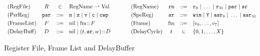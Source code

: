 \begin{figure}[!t]
	\small
	\[
		\begin{array}{lcclclccl}
			\TYPE{(RegFile)} & \RFile & \in & 
			\TYPE{RegName} \rightharpoonup \TYPE{Val}
         & \quad \ \ &
        \TYPE{(RegName)} & \regN & \define &
		 \reg{0} \sepline \dots \sepline \reg{31} \sepline \psr \sepline \sr \\
		 \\[-9pt]
		
		\TYPE{(PsrReg)} & \psr & \define &
		\regn \sepline
			\regz \sepline
			\regv \sepline
			\regc \sepline \regcwp & \quad &
		\TYPE{(SpeReg)} & \sr & \define &
		\regwim \sepline
			\regY \sepline
\asr_0 \sepline \dots \sepline \asr_{31} \\ \\[-9pt]
		
		\TYPE{(FrameList)} & \Wstack & \define &
            \nil \sepline \fm \stCons \Wstack & \quad &
		\TYPE{(Frame)} & \fm & \define & [\val_0, \dots, \val_7] 
		\\ \\[-9pt]
		
		\TYPE{(DelayBuff)} & \DBuf & \define & \nil \sepline
                                  (\tick, \sr, \word) \dbCons \DBuf
                                  & \quad
		& \TYPE{(DelayCycle)} & \tick & \in & \{ 0, 1, \dots, X \}
		\end{array}
	\]

		
		
		
	\caption{Register File, Frame List and DelayBuffer}
	\label{fig:Register File and Frame List}
\end{figure}

